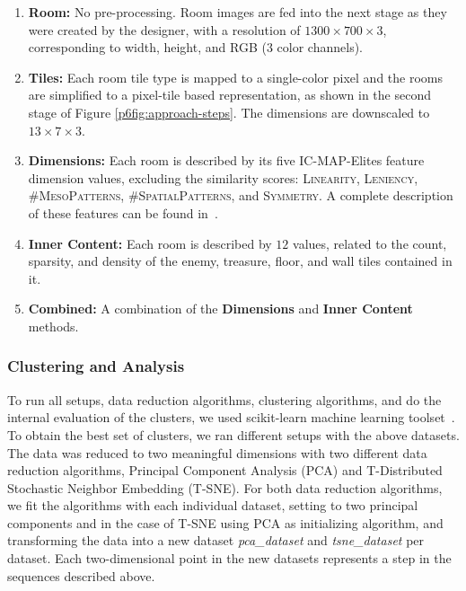 \begin{enumerate}
\setcounter{enumi}{0}
    \item \textbf{Room:} No pre-processing. Room images are fed into the next stage as they were created by the designer, with a resolution of $1300\times 700\times3$, corresponding to width, height, and RGB ($3$ color channels).
    
    \item \textbf{Tiles:} Each room tile type is mapped to a single-color pixel and the rooms are simplified to a pixel-tile based representation, as shown in the second stage of Figure \ref{p6fig:approach-steps}. The dimensions are downscaled to $13\times 7\times3$.
    
    \item \textbf{Dimensions:} Each room is described by its five IC-MAP-Elites feature dimension values, excluding the similarity scores: \textsc{Linearity}, \textsc{Leniency}, \textsc{\#MesoPatterns}, \textsc{\#SpatialPatterns}, and \textsc{Symmetry}. A complete description of these features can be found in~.
    
    \item \textbf{Inner Content:} Each room is described by $12$ values, related to the count, sparsity, and density of the enemy, treasure, floor, and wall tiles contained in it.
    
    \item \textbf{Combined:} A combination of the \textbf{Dimensions} and \textbf{Inner Content} methods.
\end{enumerate}

\subsubsection{Clustering and Analysis}

To run all setups, data reduction algorithms, clustering algorithms, and do the internal evaluation of the clusters, we used scikit-learn machine learning toolset~. To obtain the best set of clusters, we ran different setups with the above datasets. The data was reduced to two meaningful dimensions with two different data reduction algorithms, Principal Component Analysis (PCA) and T-Distributed Stochastic Neighbor Embedding (T-SNE). For both data reduction algorithms, we fit the algorithms with each individual dataset, setting to two principal components and in the case of T-SNE using PCA as initializing algorithm, and transforming the data into a new dataset \emph{pca\_dataset} and \emph{tsne\_dataset} per dataset. Each two-dimensional point in the new datasets represents a step in the sequences described above.%

